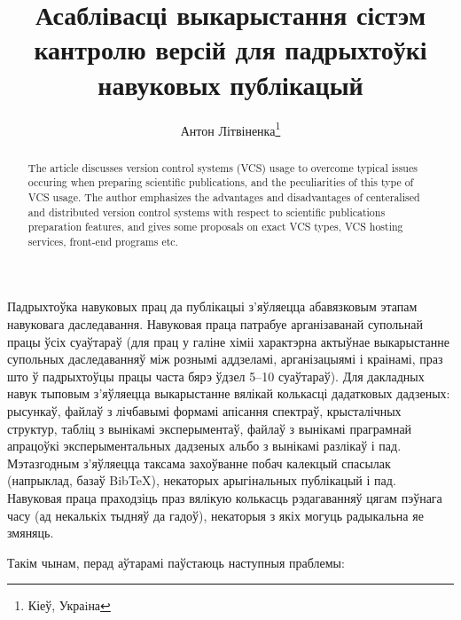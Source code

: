 \documentclass[10pt, a5paper]{article}
\begin{document}
\title{Асаблівасці выкарыстання сістэм кантролю версій для падрыхтоўкі навуковых публікацый}%

\author{Антон Літвіненка\footnote{Кіеў, Украiна}}
\maketitle

\begin{abstract}
The article discusses version control systems (VCS) usage to overcome typical issues occuring when preparing scientific publications, and the peculiarities of this type of VCS usage. The author emphasizes the advantages and disadvantages of centeralised and distributed version control systems with respect to scientific publications preparation features, and gives some proposals on exact VCS types, VCS hosting services, front-end programs etc.
\end{abstract}

Падрыхтоўка навуковых прац да публікацыі з'яўляецца абавязковым этапам навуковага даследавання. Навуковая праца патрабуе арганізаванай супольнай працы ўсіх суаўтараў (для прац у галіне хіміі характэрна актыўнае выкарыстанне супольных даследаванняў між рознымі аддзеламі, арганізацыямі і краінамі, праз што ў падрыхтоўцы працы часта бярэ ўдзел 5--10 суаўтараў). Для дакладных навук тыповым з'яўляецца выкарыстанне вялікай колькасці дадатковых дадзеных: рысункаў, файлаў з лічбавымі формамі апісання спектраў, крысталічных структур, табліц з вынікамі эксперыментаў, файлаў з вынікамі праграмнай апрацоўкі эксперыментальных дадзеных альбо з вынікамі разлікаў і пад. Мэтазгодным з'яўляецца таксама захоўванне побач калекцый спасылак (напрыклад, базаў BibTeX), некаторых арыгінальных публікацый і пад. Навуковая праца праходзіць праз вялікую колькасць рэдагаванняў цягам пэўнага часу (ад некалькіх тыдняў да гадоў), некаторыя з якіх могуць радыкальна яе змяняць.

Такім чынам, перад аўтарамі паўстаюць наступныя праблемы:
\end{document}
